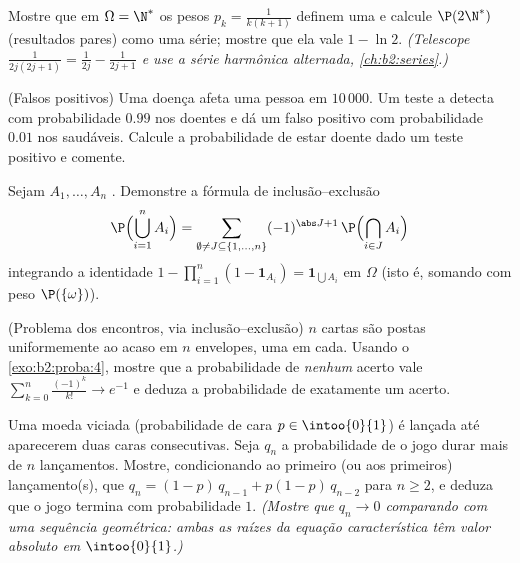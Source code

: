\begin{exercise}[$\star$]\label{exo:b2:proba:2}
Mostre que em $\Omega = \N^*$ os pesos $p_k = \frac{1}{k(k+1)}$
definem uma  e calcule $\P(2\N^*)$ (resultados
pares) como uma série; mostre que ela vale $1 - \ln 2$.
\emph{(Telescope $\frac{1}{2j(2j+1)} = \frac{1}{2j} -
\frac{1}{2j+1}$ e use a série harmônica alternada,
\cref{ch:b2:series}.)}
\end{exercise}

\begin{exercise}[$\star$]\label{exo:b2:proba:3}
(Falsos positivos) Uma doença afeta uma pessoa em $10\,000$. Um
teste a detecta com probabilidade $0.99$ nos doentes e dá um
falso positivo com probabilidade $0.01$ nos saudáveis. Calcule
a probabilidade de estar doente dado um teste positivo e comente.
\end{exercise}

\begin{exercise}[$\star\star$]\label{exo:b2:proba:4}
Sejam $A_1, \dots, A_n$ . Demonstre a fórmula de
inclusão--exclusão
\[
\P\Bigl(\bigcup_{i=1}^n A_i\Bigr)
= \sum_{\emptyset \neq J \subseteq \{1,\dots,n\}}
(-1)^{\abs J + 1}\,\P\Bigl(\bigcap_{i \in J}A_i\Bigr)
\]
integrando a identidade $1 - \prod_{i=1}^n(1 -
\mathbf{1}_{A_i}) = \mathbf{1}_{\bigcup A_i}$ em $\Omega$
(isto é, somando com peso $\P(\{\omega\})$).
\end{exercise}

\begin{exercise}[$\star\star$]\label{exo:b2:proba:5}
(Problema dos encontros, via inclusão--exclusão) $n$ cartas são postas
uniformemente ao acaso em $n$ envelopes, uma em cada. Usando o
\cref{exo:b2:proba:4}, mostre que a probabilidade de \emph{nenhum}
acerto vale $\sum_{k=0}^n \frac{(-1)^k}{k!} \to e^{-1}$ e
deduza a probabilidade de exatamente um acerto.
\end{exercise}

\begin{exercise}[$\star\star$]\label{exo:b2:proba:6}
Uma moeda viciada (probabilidade de cara $p \in \intoo{0}{1}$) é lançada
até aparecerem duas caras consecutivas. Seja $q_n$ a probabilidade
de o jogo durar mais de $n$ lançamentos. Mostre, condicionando ao
primeiro (ou aos primeiros) lançamento(s), que $q_n = (1-p)\,q_{n-1} + p(1-p)\,q_{n-2}$
para $n \geq 2$, e deduza que o jogo termina com probabilidade
$1$. \emph{(Mostre que $q_n \to 0$ comparando com uma sequência
geométrica: ambas as raízes da equação característica têm valor absoluto
em $\intoo{0}{1}$.)}
\end{exercise}

